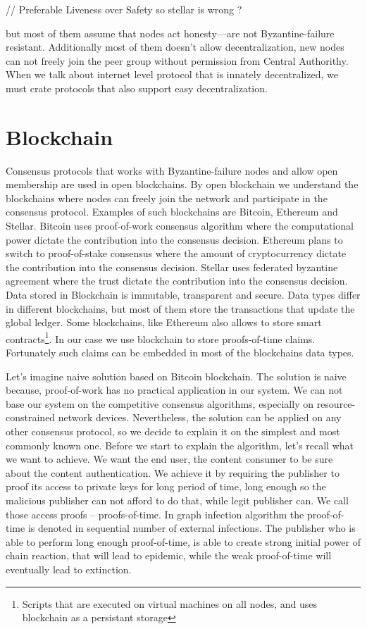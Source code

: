 \documentclass[nostrict]{szablonPG}
\begin{document}
// Preferable Liveness over Safety so stellar is wrong ?

but most of them assume that nodes act honesty---are not Byzantine-failure resistant. Additionally most of them doesn't allow decentralization, new nodes can not freely join the peer group without permission from Central Authorithy. When we talk about internet level protocol that is innately decentralized, we must crate protocols that also support easy decentralization.

\section{Blockchain}
Consensus protocols that works with Byzantine-failure nodes and allow open membership are used in open blockchains. By open blockchain we understand the blockchains where nodes can freely join the network and participate in the consensus protocol. Examples of such blockchains are Bitcoin, Ethereum and Stellar. Bitcoin uses proof-of-work consensus algorithm where the computational power dictate the contribution into the consensus decision. Ethereum plans to switch to proof-of-stake consensus where the amount of cryptocurrency dictate the contribution into the consensus decision. Stellar uses federated byzantine agreement where the trust dictate the contribution into the consensus decision. Data stored in Blockchain is immutable, transparent and secure. Data types differ in different blockchains, but most of them store the transactions that update the global ledger. Some blockchains, like Ethereum also allows to store smart contracts\footnote{Scripts that are executed on virtual machines on all nodes, and uses blockchain as a persistant storage}. In our case we use blockchain to store proofs-of-time claims. Fortunately such claims can be embedded in most of the blockchains data types.

Let's imagine naive solution based on Bitcoin blockchain. The solution is naive because, proof-of-work has no practical application in our system. We can not base our system on the competitive consensus algorithms, especially on resource-constrained network devices. Nevertheless, the solution can be applied on any other consensus protocol, so we decide to explain it on the simplest and most commonly known one. 
Before we start to explain the algorithm, let's recall what we want to achieve. We want the end user, the content consumer to be sure about the content authentication. We achieve it by requiring the publisher to proof its access to private keys for long period of time, long enough so the malicious publisher can not afford to do that, while legit publisher can. We call those access proofs -- proofs-of-time. In graph infection algorithm the proof-of-time is denoted in sequential number of external infections. The publisher who is able to perform long enough proof-of-time, is able to create strong initial power of chain reaction, that will lead to epidemic, while the weak proof-of-time will eventually lead to extinction. 
\end{document}
